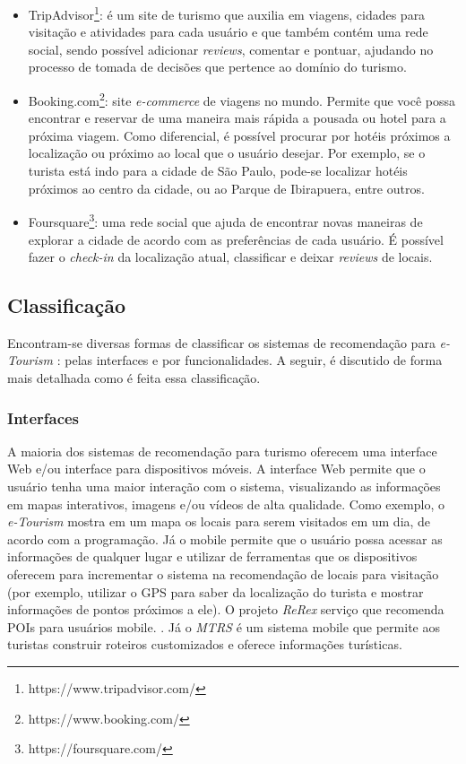 \begin{itemize}
    \item TripAdvisor\footnote{https://www.tripadvisor.com/}: é um site de turismo que auxilia em viagens, cidades para visitação e atividades para cada usuário e que também contém uma rede social, sendo possível adicionar \textit{reviews}, comentar e pontuar, ajudando no processo de tomada de decisões que pertence ao domínio do turismo.
    \item Booking.com\footnote{https://www.booking.com/}: site \textit{e-commerce} de viagens no mundo. Permite que você possa encontrar e reservar de uma maneira mais rápida a pousada ou hotel para a próxima viagem. Como diferencial, é possível procurar por hotéis próximos a localização ou próximo ao local que o usuário desejar. Por exemplo, se o turista está indo para a cidade de São Paulo, pode-se localizar hotéis próximos ao centro da cidade, ou ao Parque de Ibirapuera, entre outros.
    \item Foursquare\footnote{https://foursquare.com/}: uma rede social que ajuda de encontrar novas maneiras de explorar a cidade de acordo com as preferências de cada usuário. É possível fazer o \textit{check-in} da localização atual, classificar e deixar \textit{reviews} de locais.
\end{itemize}

\subsection{Classificação}
\label{subsec:eTourism_classification}

Encontram-se diversas formas de classificar os sistemas de recomendação para \textit{e-Tourism} \citep{BORRAS20147370}: pelas interfaces e por funcionalidades. A seguir, é discutido de forma mais detalhada como é feita essa classificação.

\subsubsection{Interfaces}
\label{subsubsec:eTourism_classification_interfaces}

A maioria dos sistemas de recomendação para turismo oferecem uma interface Web e/ou interface para dispositivos móveis. A interface Web permite que o usuário tenha uma maior interação com o sistema, visualizando as informações em mapas interativos, imagens e/ou vídeos de alta qualidade.  Como exemplo, o \textit{e-Tourism} \citep{4669760} mostra em um mapa os locais para serem visitados em um dia, de acordo com a programação.
Já o mobile permite que o usuário possa acessar as informações de qualquer lugar e utilizar de ferramentas que os dispositivos oferecem para incrementar o sistema na recomendação de locais para visitação (por exemplo, utilizar o GPS para saber da localização do turista e mostrar informações de pontos próximos a ele). O projeto \textit{ReRex} serviço que recomenda POIs para usuários mobile. \citep{Baltrunas2012}. Já o \textit{MTRS} \citep{Gavalas2011} é um sistema mobile que permite aos turistas construir roteiros customizados e oferece informações turísticas.

